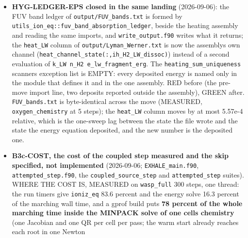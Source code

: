 \documentclass[english,a4paper]{my_memo}
\begin{document}
\begin{itemize}
  He+ balance returns it, so where \texttt{k\_D1\ n\_CO} exceeds the He+ loss rate both
  the destruction and that heating peak are over-stated. The fix is a sink in
  the He+ row of \texttt{mol\_heh\_rows} (\texttt{System\_HeH\_mol.f90}), not this item\textquotesingle s file;
  \texttt{dom\_cells\_HeP} is the observable.
  \textbf{Not done, carried over:} the thermodynamic CO ceiling is still in
  \texttt{limit\_to\_element\_budget}; deleting it changes \texttt{EXHALE\_main.f90},
  \texttt{certification.f90} and \texttt{write\_setup\_report.f90}, none of them this
  item\textquotesingle s files. The exact lines are in the item\textquotesingle s report.
\item
  \textbf{HYG-LEDGER-EPS closed in the same landing} (2026-09-06): the FUV band
  ledger of \texttt{output/FUV\_bands.txt} is formed by
  \texttt{utils\_ion\_eq::fuv\_band\_absorption\_ledger}, beside the heating assembly
  and reading the same imports, and \texttt{write\_output.f90} writes what it
  returns; the \texttt{heat\_LW} column of \texttt{output/Lyman\_Werner.txt} is now the
  assembly\textquotesingle s own channel (\texttt{heat\_channel\_state(:,ih\_H2\_LW\_dissoc)}) instead
  of a second evaluation of \texttt{k\_LW\ n\_H2\ e\_lw\_fragment\_erg}. The
  \texttt{heating\_sum\_uniqueness} scanner\textquotesingle s exception list is EMPTY: every
  deposited energy is named only in the module that defines it and in the
  one assembly. RED before (the pre-move import line, two deposits reported
  outside the assembly), GREEN after. \texttt{FUV\_bands.txt} is byte-identical
  across the move (MEASURED, \texttt{oxygen\_chemistry} at 5 steps); the \texttt{heat\_LW}
  column moves by at most 5.57e-4 relative, which is the one-sweep lag
  between the state the file wrote and the state the energy equation
  deposited, and the new number is the deposited one.
\item
  \textbf{B3c-COST, the cost of the coupled step measured and the skip specified,
  not implemented} (2026-09-06; \texttt{EXHALE\_main.f90}, \texttt{attempted\_step.f90},
  the \texttt{coupled\_source\_step} and \texttt{attempted\_step} suites). WHERE THE COST IS,
  MEASURED on \texttt{wasp\_full} 300 steps, one thread: the run timers give
  \texttt{ioniz\_eq} 83.6 percent and the energy solve 16.3 percent of the marching
  wall time, and a gprof build puts \textbf{78 percent of the whole marching time
  inside the MINPACK solve of one cell\textquotesingle s chemistry} (one Jacobian and one QR
  per cell per pass; the warm start already reaches each root in one Newton

\end{itemize}
\end{document}

